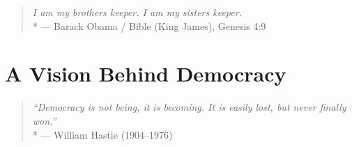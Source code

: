 







\begin{quote}
	\emph{I am my brothers keeper. I am my sisters keeper.}\\*
	--- Barack Obama / Bible (King James), Genesis 4:9
\end{quote}

\section{A Vision Behind Democracy}

\begin{quote}
	\emph{``Democracy is not being, it is becoming. It is easily lost, but never finally won.''}\\*
	--- William Hastie (1904--1976)
\end{quote}

